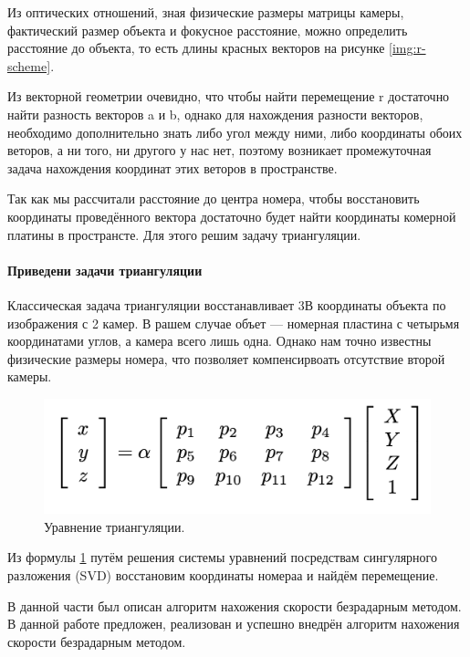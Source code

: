 \documentclass[specification,annotation,times]{itmo-student-thesis}
\begin{document}
Из оптических отношений, зная физические размеры матрицы камеры, фактический размер объекта и фокусное расстояние, можно определить расстояние до объекта, то есть длины красных векторов на рисунке \ref{img:r-scheme}. 

Из векторной геометрии очевидно, что чтобы найти перемещение r достаточно найти разность векторов a и b, однако для нахождения разности векторов, необходимо дополнительно знать либо угол между ними, либо координаты обоих веторов, а ни того, ни другого у нас нет, поэтому возникает промежуточная задача нахождения координат этих веторов в пространстве.

Так как мы рассчитали расстояние до центра номера, чтобы восстановить координаты проведённого вектора достаточно будет найти координаты комерной платины в пространсте. Для этого решим задачу триангуляции.

\paragraph{Приведени задачи триангуляции}
Классическая задача триангуляции восстанавливает 3В координаты объекта по изображения с 2 камер. В рашем случае объет --- номерная пластина с четырьмя координатами углов, а камера всего лишь одна. Однако нам точно известны физические размеры номера, что позволяет компенсирвоать отсутствие второй камеры. 

\begin{figure}[!ht]
	\caption{Уравнение триангуляции.}\label{img:eq}
	\includegraphics[width=0.85\linewidth]{../png/eq.png}
	\centering
\end{figure}

Из формулы \ref{img:eq} путём решения системы уравнений посредствам сингулярного разложения (SVD) восстановим координаты номераа и найдём перемещение.

\chapterconclusion
В данной части был описан алгоритм нахожения скорости безрадарным методом.
\startconclusionpage
В данной работе предложен, реализован и успешно внедрён алгоритм нахожения скорости безрадарным методом.
\end{document}
